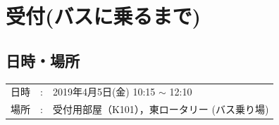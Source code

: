 %

\section{受付(バスに乗るまで)}

\subsection{日時・場所}

\begin{tabular}{p{}rp{}}
日時 & : & 2019年4月5日(金) 10:15 $\sim$ 12:10\\
場所 & : & 受付用部屋（K101），東ロータリー (バス乗り場)
\end{tabular}


